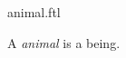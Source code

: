 \documentclass{stex}
\begin{document}
\begin{smodule}{animal.ftl}

  \begin{signature}[forthel]
    A \emph{animal} is a being.
  \end{signature}
\end{smodule}
\end{document}
